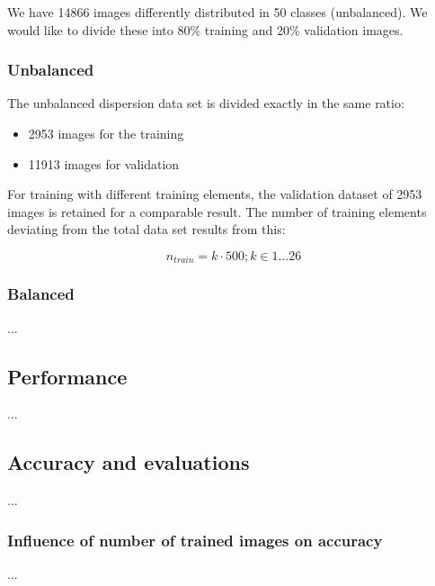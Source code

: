 \documentclass[10pt]{article}
\begin{document}
				We have 14866 images differently distributed in 50 classes (unbalanced). We would like to divide these into 80\% training and 20\% validation images.
				
			\subsubsection{Unbalanced}
			
				The unbalanced dispersion data set is divided exactly in the same ratio:
				
				\begin{itemize}
					\item 2953 images for the training
					\item 11913 images for validation
				\end{itemize}
				
				For training with different training elements, the validation dataset of 2953 images is retained for a comparable result. The number of training elements deviating from the total data set results from this:
				
				\begin{equation}
					n_{train} = k \cdot 500;  k \in 1 \dots 26
				\end{equation}
			
			\subsubsection{Balanced}
		
				\noindent ...
	
		\subsection{Performance}
		
			\noindent ...
		
		\pagebreak
	
		\subsection{Accuracy and evaluations}

			\noindent ...

			\subsubsection{Influence of number of trained images on accuracy}
	
				\noindent ...
\end{document}
